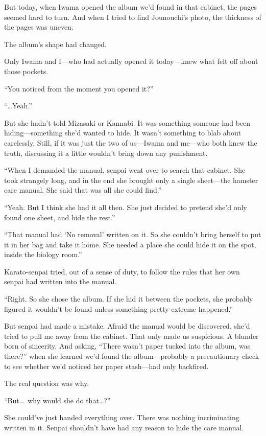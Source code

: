 \documentclass[
    a4paper,
    12pt,
    twoside,
    openany,
    UTF8,
    fontset=windows
]{ctexbook}
\begin{document}
But today, when Iwama opened the album we'd found in that cabinet, the pages seemed hard to turn. And when I tried to find Jounouchi's photo, the thickness of the pages was uneven.

The album's shape had changed.

Only Iwama and I---who had actually opened it today---knew what felt off about those pockets.

``You noticed from the moment you opened it?''

``\dots Yeah.''

But she hadn't told Mizasaki or Kannabi. It was something someone had been hiding---something she'd wanted to hide. It wasn't something to blab about carelessly. Still, if it was just the two of us---Iwama and me---who both knew the truth, discussing it a little wouldn't bring down any punishment.

``When I demanded the manual, senpai went over to search that cabinet. She took strangely long, and in the end she brought only a single sheet---the hamster care manual. She said that was all she could find.''

``Yeah. But I think she had it all then. She just decided to pretend she'd only found one sheet, and hide the rest.''

``That manual had `No removal' written on it. So she couldn't bring herself to put it in her bag and take it home. She needed a place she could hide it on the spot, inside the biology room.''

Karato-senpai tried, out of a sense of duty, to follow the rules that her own senpai had written into the manual.

``Right. So she chose the album. If she hid it between the pockets, she probably figured it wouldn't be found unless something pretty extreme happened.''

But senpai had made a mistake. Afraid the manual would be discovered, she'd tried to pull me away from the cabinet. That only made us suspicious. A blunder born of sincerity. And asking, ``There wasn't paper tucked into the album, was there?'' when she learned we'd found the album---probably a precautionary check to see whether we'd noticed her paper stash---had only backfired.

The real question was why.

``But\dots\ why would she do that\dots?''

She could've just handed everything over. There was nothing incriminating written in it. Senpai shouldn't have had any reason to hide the care manual.
\end{document}
